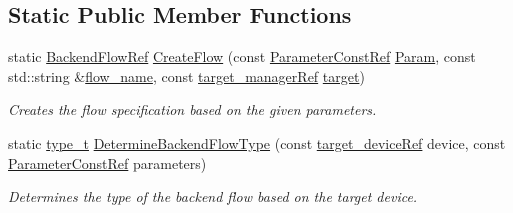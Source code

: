 \subsection*{Static Public Member Functions}
\begin{DoxyCompactItemize}
\item 
static \hyperlink{BackendFlow_8hpp_addb01ef393ed4ea8a79765c8ebfcf5a0}{Backend\+Flow\+Ref} \hyperlink{classBackendFlow_a8a639cfcc249bb8242365356727b3c4c}{Create\+Flow} (const \hyperlink{Parameter_8hpp_a37841774a6fcb479b597fdf8955eb4ea}{Parameter\+Const\+Ref} \hyperlink{classBackendFlow_a7d21e7cf0afc64b13e0009c9e351873d}{Param}, const std\+::string \&\hyperlink{classBackendFlow_acb230ccab7e32cf0a88811097ff8c3f8}{flow\+\_\+name}, const \hyperlink{target__manager_8hpp_aee0b586a84fb6eb4faefa6e41e1735a9}{target\+\_\+manager\+Ref} \hyperlink{classBackendFlow_a693ab6eaf29b1836eb91dcd92eb0189f}{target})
\begin{DoxyCompactList}\small\item\em Creates the flow specification based on the given parameters. \end{DoxyCompactList}\item 
static \hyperlink{classBackendFlow_ac342772f1d3890eb1aad9a8de911da08}{type\+\_\+t} \hyperlink{classBackendFlow_ac9035b8c54cffb28b61036aed44e5381}{Determine\+Backend\+Flow\+Type} (const \hyperlink{target__device_8hpp_acedb2b7a617e27e6354a8049fee44eda}{target\+\_\+device\+Ref} device, const \hyperlink{Parameter_8hpp_a37841774a6fcb479b597fdf8955eb4ea}{Parameter\+Const\+Ref} parameters)
\begin{DoxyCompactList}\small\item\em Determines the type of the backend flow based on the target device. \end{DoxyCompactList}\end{DoxyCompactItemize}
